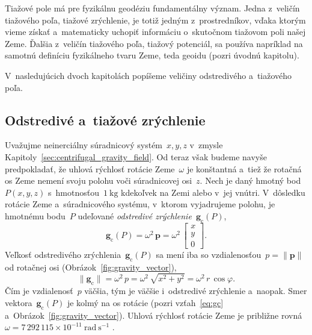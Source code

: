 \documentclass[a4paper, 12pt]{book}
\newcommand{\cidx}{\mathrm c}
\let\vec\mathbf
\begin{document}
Tiažové pole má pre fyzikálnu geodéziu fundamentálny význam.  Jedna z~veličín 
tiažového poľa, tiažové zrýchlenie, je totiž jedným z~prostredníkov, vďaka 
ktorým vieme získať a~matematicky uchopiť informáciu o~skutočnom tiažovom poli 
našej Zeme.  Ďalšia z~veličín tiažového poľa, tiažový potenciál, sa používa 
napríklad na samotnú definíciu fyzikálneho tvaru Zeme, teda geoidu (pozri 
úvodnú kapitolu).

V~nasledujúcich dvoch kapitolách popíšeme veličiny odstredivého a~tiažového 
poľa.






\subsection{Odstredivé a~tiažové zrýchlenie}
\label{sec:centrifugal_and_gravity_acceleration}

Uvažujme neinerciálny súradnicový systém~$x, y, z$ v~zmysle 
Kapitoly~\ref{sec:centrifugal_gravity_field}.  Od teraz však budeme navyše 
predpokladať, že uhlová rýchlosť rotácie Zeme~$\omega$ je konštantná a~tiež že 
rotačná os Zeme nemení svoju polohu voči súradnicovej osi~$z$.  Nech je daný 
hmotný bod~$P(x, y, z)$ s~hmotnosťou~$1\ \mathrm{kg}$ kdekoľvek na Zemi alebo 
v~jej vnútri.  V~dôsledku rotácie Zeme a~súradnicového systému, v~ktorom 
vyjadrujeme polohu, je hmotnému bodu~$P$ udeľované \emph{odstredivé 
zrýchlenie}~$\vec g_\cidx(P)$,
%
\begin{equation}
\label{eq:gc}
\vec g_\cidx(P) = \omega^2 \, \vec p =
%
\omega^2 \, \begin{bmatrix}
x\\
y\\
0
\end{bmatrix}
%
{.}
\end{equation}
%
Veľkosť odstredivého zrýchlenia~$\vec g_\cidx(P)$ sa mení iba so 
vzdialenosťou~$p = \| \vec p \|$ od rotačnej osi 
(Obrázok~\ref{fig:gravity_vector}),
%
\begin{equation}
\label{eq:gc_magnitude}
\| \vec g_\cidx \| = \omega^2 \, p = \omega^2 \, \sqrt{x^2 + y^2} = \omega^2 \, 
r \, \cos\varphi{.}
\end{equation}
%
Čím je vzdialenosť~$p$ väčšia, tým je väčšie i~odstredivé zrýchlenie a~naopak.
Smer vektora~$\vec g_\cidx(P)$ je kolmý na os
rotácie (pozri vzťah~\ref{eq:gc} a~Obrázok~\ref{fig:gravity_vector}).  Uhlová 
rýchlosť rotácie Zeme je približne
rovná~$\omega = 7\, 292\, 115 \times 10^{-11} \ \mathrm{rad} \ \mathrm{s}^{-1}$ 
\parencite{GRS80}{.}
\end{document}
